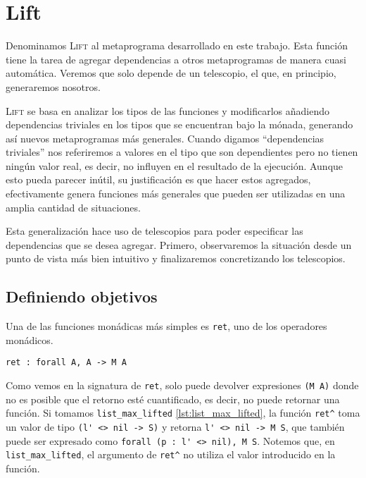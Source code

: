 \chapter{Lift}\label{ch:lift}

Denominamos \textsc{Lift} al metaprograma desarrollado en este trabajo.
Esta función tiene la tarea de agregar dependencias a otros metaprogramas de manera cuasi automática. Veremos que solo depende de un telescopio, el que, en principio, generaremos nosotros.

\textsc{Lift} se basa en analizar los tipos de las funciones y modificarlos añadiendo dependencias triviales en los tipos que se encuentran bajo la mónada, generando así nuevos metaprogramas más generales.
Cuando digamos ``dependencias triviales'' nos referiremos a valores en el tipo que son dependientes pero no tienen ningún valor real, es decir, no influyen en el resultado de la ejecución.
Aunque esto pueda parecer inútil, su justificación es que hacer estos agregados, efectivamente genera funciones más generales que pueden ser utilizadas en una amplia cantidad de situaciones. 

Esta generalización hace uso de telescopios para poder especificar las dependencias que se desea agregar.
Primero, observaremos la situación desde un punto de vista más bien intuitivo y finalizaremos concretizando los telescopios.

\section{Definiendo objetivos}

Una de las funciones monádicas más simples es \lstinline{ret}, uno de los operadores monádicos.

\begin{lstlisting}[frame=tb,caption={Signatura de \lstinline{ret}},label=lst:ret]
ret : forall A, A -> M A
\end{lstlisting}

Como vemos en la signatura de \lstinline{ret}, solo puede devolver expresiones \lstinline{(M A)} donde no es posible que el retorno esté cuantificado, es decir, no puede retornar una función.
Si tomamos \lstinline{list_max_lifted} \ref{lst:list_max_lifted}, la función \lstinline{ret^} toma un valor de tipo \lstinline{(l' <> nil -> S)} y retorna \lstinline{l' <> nil -> M S}, que también puede ser expresado como \lstinline{forall (p : l' <> nil), M S}.
Notemos que, en \lstinline{list_max_lifted}, el argumento de \lstinline{ret^} no utiliza el valor introducido en la función.


